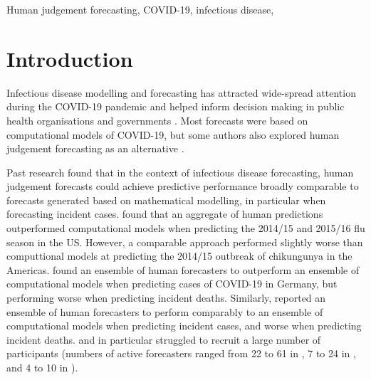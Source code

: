 \documentclass[10pt,a4paper,twocolumn]{article}
\begin{document}
Human judgement forecasting, COVID-19, infectious disease, 



\clearpage

\section*{Introduction}

Infectious disease modelling and forecasting has attracted wide-spread attention during the COVID-19 pandemic and helped inform decision making in public health organisations and governments \cite{cramerEvaluationIndividualEnsemble2021, venkatramananUtilityHumanJudgment2022}. 
Most forecasts were based on computational models of COVID-19, but some authors also explored human judgement forecasting as an alternative \cite{recchiaHowWellDid2021, mcandrewExpertJudgmentModel2022, bosseComparingHumanModelbased2022, mcandrewChimericForecastingCombining2022}. 

Past research found that in the context of infectious disease forecasting, human judgement forecasts could achieve predictive performance broadly comparable to forecasts generated based on mathematical modelling, in particular when forecasting incident cases. \citet{farrowHumanJudgmentApproach2017} found that an aggregate of human predictions outperformed computational models when predicting the 2014/15 and 2015/16 flu season in the US. However, a comparable approach performed slightly worse than computtional models at predicting the 2014/15 outbreak of chikungunya in the Americas. 
\citet{bosseComparingHumanModelbased2022} found an ensemble of human forecasters to outperform an ensemble of computational models when predicting cases of COVID-19 in Germany, but performing worse when predicting incident deaths. Similarly, \citet{mcandrewChimericForecastingCombining2022} reported an ensemble of human forecasters to perform comparably to an ensemble of computational models when predicting incident cases, and worse when predicting incident deaths. \citet{farrowHumanJudgmentApproach2017} and in particular \citet{bosseComparingHumanModelbased2022} struggled to recruit a large number of participants (numbers of active forecasters ranged from 22 to 61 in \citet{mcandrewChimericForecastingCombining2022}, 7 to 24 in \citet{farrowHumanJudgmentApproach2017}, and 4 to 10 in \citet{bosseComparingHumanModelbased2022}). 
\end{document}
